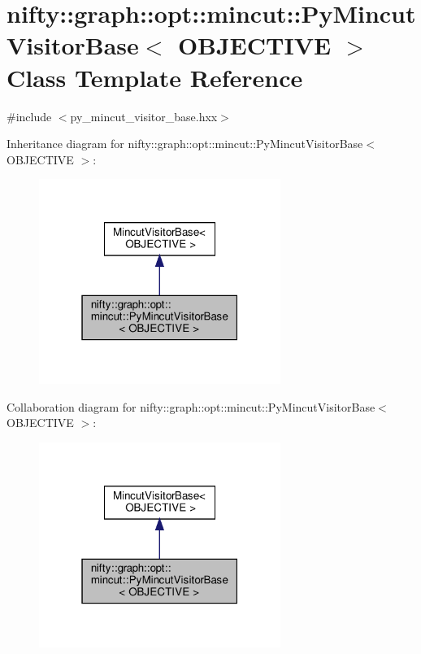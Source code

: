 \hypertarget{classnifty_1_1graph_1_1opt_1_1mincut_1_1PyMincutVisitorBase}{}\section{nifty\+:\+:graph\+:\+:opt\+:\+:mincut\+:\+:Py\+Mincut\+Visitor\+Base$<$ O\+B\+J\+E\+C\+T\+I\+VE $>$ Class Template Reference}
\label{classnifty_1_1graph_1_1opt_1_1mincut_1_1PyMincutVisitorBase}


{\ttfamily \#include $<$py\+\_\+mincut\+\_\+visitor\+\_\+base.\+hxx$>$}



Inheritance diagram for nifty\+:\+:graph\+:\+:opt\+:\+:mincut\+:\+:Py\+Mincut\+Visitor\+Base$<$ O\+B\+J\+E\+C\+T\+I\+VE $>$\+:
\nopagebreak
\begin{figure}[H]
\begin{center}
\leavevmode
\includegraphics[width=223pt]{classnifty_1_1graph_1_1opt_1_1mincut_1_1PyMincutVisitorBase__inherit__graph}
\end{center}
\end{figure}


Collaboration diagram for nifty\+:\+:graph\+:\+:opt\+:\+:mincut\+:\+:Py\+Mincut\+Visitor\+Base$<$ O\+B\+J\+E\+C\+T\+I\+VE $>$\+:
\nopagebreak
\begin{figure}[H]
\begin{center}
\leavevmode
\includegraphics[width=223pt]{classnifty_1_1graph_1_1opt_1_1mincut_1_1PyMincutVisitorBase__coll__graph}
\end{center}
\end{figure}
